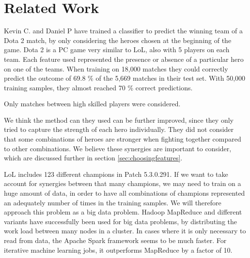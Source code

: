 \section{Related Work}\label{sec:relatedwork}

Kevin C. and Daniel P have trained a classifier to predict the winning team of a Dota 2 match\cite{dota2article}, by only considering the heroes chosen at the beginning of the game. Dota 2 is a PC game very similar to LoL, also with 5 players on each team.
Each feature used represented the presence or absence of a particular hero on one of the teams.
When training on 18,000 matches they could correctly predict the outcome of 69.8 \% of the 5,669 matches in their test set.
With 50,000 training samples, they almost reached 70 \% correct predictions.

Only matches between high skilled players were considered.

We think the method can they used can be further improved, since they only tried to capture the strength of each hero individually.
They did not consider that some combinations of heroes are stronger when fighting together compared to other combinations.
We believe these synergies are important to consider, which are discussed further in section \ref{sec:choosingfeatures}.

LoL includes 123 different champions in Patch 5.3.0.291. If we want to take account for synergies between that many champions, we may need to train on a huge amount of data, in order to have all combinations of champions represented an adequately number of times in the training samples. We will therefore approach this problem as a big data problem.
Hadoop MapReduce and different variants have successfully been used for big data problems, by distributing the work load between many nodes in a cluster\cite{ApacheSpark}.
In cases where it is only necessary to read from data, the Apache Spark framework seems to be much faster.
For iterative machine learning jobs, it outperforms MapReduce by a factor of 10.